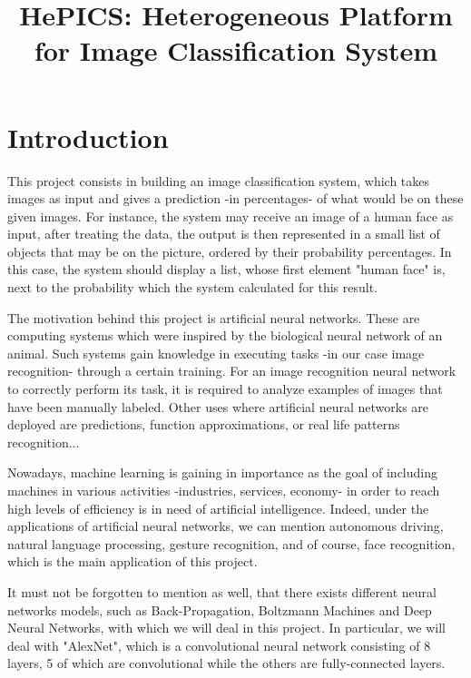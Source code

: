 \documentclass[parskip=full]{scrartcl}
\title{HePICS: Heterogeneous Platform for Image Classification System}
\begin{document}
\maketitle
\thispagestyle{empty}
\pagebreak





\tableofcontents
\pagebreak





\section {Introduction}

This project consists in building an image classification system, which takes images as input and gives a prediction -in percentages- of what would be on these given images. For instance, the system may receive an image of a human face as input, after treating the data, the output is then represented in a small list of objects that may be on the picture, ordered by their probability percentages. In this case, the system should display a list, whose first element "human face" is, next to the probability which the system calculated for this result.

The motivation behind this project is artificial neural networks. These are computing systems which were inspired by the biological neural network of an animal. Such systems gain knowledge in executing tasks -in our case image recognition- through a certain training. For an image recognition neural network to correctly perform its task, it is required to analyze examples of images that have been manually labeled. Other uses where artificial neural networks are deployed are predictions, function approximations, or real life patterns recognition...

Nowadays, machine learning is gaining in importance as the goal of including machines in various activities -industries, services, economy- in order to reach high levels of efficiency is in need of artificial intelligence. Indeed, under the applications of artificial neural networks, we can mention autonomous driving, natural language processing, gesture recognition, and of course, face recognition, which is the main application of this project.

It must not be forgotten to mention as well, that there exists different neural networks models, such as Back-Propagation, Boltzmann Machines and Deep Neural Networks, with which we will deal in this project. In particular, we will deal with "AlexNet", which is a convolutional neural network consisting of 8 layers, 5 of which are convolutional while the others are fully-connected layers.
\end{document}
